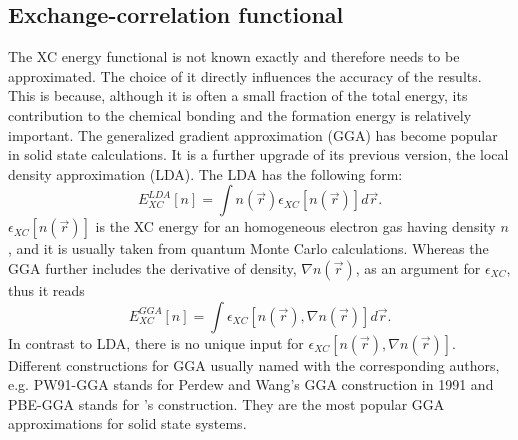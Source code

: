 \subsection{Exchange-correlation functional}
The XC energy functional is not known exactly and therefore needs to be approximated. The choice of it directly influences the accuracy of the results. This is because, although it is often a small fraction of the total energy, its contribution to the chemical bonding and the formation energy is relatively important. The generalized gradient approximation (GGA) has become popular in solid state calculations. It is a further upgrade of its previous version, the local density approximation (LDA). The LDA has the following form:
\begin{equation}
E_{XC}^{LDA}[n]=\int n(\vec{r})\epsilon_{XC}[n(\vec{r})]d\vec{r}.
\end{equation}
$\epsilon_{XC}[n(\vec{r})]$ is the XC energy for an homogeneous electron gas having density $n$, and it is usually taken from quantum Monte Carlo calculations. Whereas the GGA further includes the derivative of density, $\nabla n(\vec{r})$, as an argument for $\epsilon_{XC}$, thus it reads
\begin{equation}
E_{XC}^{GGA}[n]=\int \epsilon_{XC}[n(\vec{r}),\nabla n(\vec{r})]d\vec{r}.
\end{equation}
In contrast to LDA, there is no unique input for $\epsilon_{XC}[n(\vec{r}),\nabla n(\vec{r})]$. Different constructions for GGA usually named with the corresponding authors, e.g. PW91-GGA stands for Perdew and Wang's GGA construction in 1991\cite{Perdew1991,Perdew1992} and PBE-GGA stands for \citet{GGA-PBE2}'s construction. They are the most popular GGA approximations for solid state systems. 
